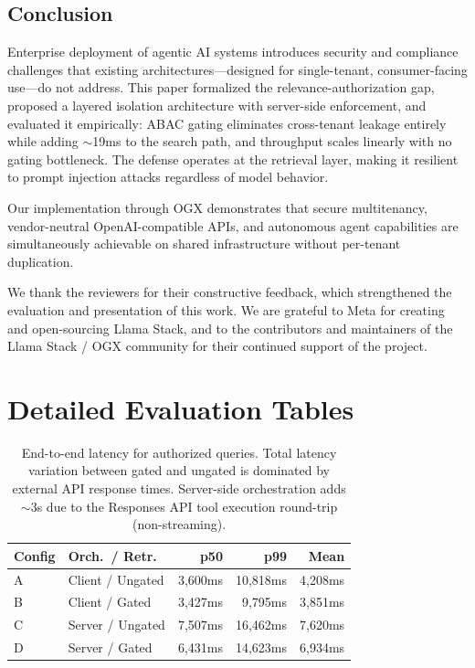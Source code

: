 \documentclass[sigconf]{acmart}
\begin{document}
\subsection{Conclusion}
Enterprise deployment of agentic AI systems introduces security and compliance challenges that existing architectures---designed for single-tenant, consumer-facing use---do not address. This paper formalized the relevance-authorization gap, proposed a layered isolation architecture with server-side enforcement, and evaluated it empirically: ABAC gating eliminates cross-tenant leakage entirely while adding ${\sim}$19ms to the search path, and throughput scales linearly with no gating bottleneck. The defense operates at the retrieval layer, making it resilient to prompt injection attacks regardless of model behavior.

Our implementation through OGX demonstrates that secure multitenancy, vendor-neutral OpenAI-compatible APIs, and autonomous agent capabilities are simultaneously achievable on shared infrastructure without per-tenant duplication.

\begin{acks}
We thank the reviewers for their constructive feedback, which strengthened the evaluation and presentation of this work. We are grateful to Meta for creating and open-sourcing Llama Stack, and to the contributors and maintainers of the Llama Stack / OGX community for their continued support of the project.
\end{acks}





\appendix
\clearpage

\section{Detailed Evaluation Tables}
\label{sec:eval-tables}
\label{sec:latency-tables}

\begin{table}[h]
  \centering
  \small
  \begin{tabular}{ll|rrr}
  \toprule
  Config & Orch.\ / Retr.\ & p50 & p99 & Mean \\
  \midrule
  A & Client / Ungated & 3,600ms & 10,818ms & 4,208ms \\
  B & Client / Gated & 3,427ms & 9,795ms & 3,851ms \\
  C & Server / Ungated & 7,507ms & 16,462ms & 7,620ms \\
  D & Server / Gated & 6,431ms & 14,623ms & 6,934ms \\
  \bottomrule
  \end{tabular}
  \caption{End-to-end latency for authorized queries. Total latency variation between gated and ungated is dominated by external API response times. Server-side orchestration adds ${\sim}$3s due to the Responses API tool execution round-trip (non-streaming).}
  \label{tab:latency}
\end{table}
\end{document}
